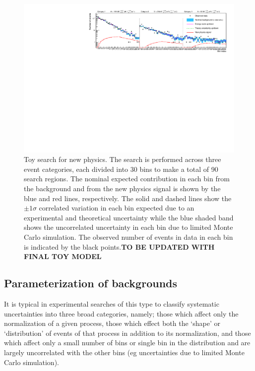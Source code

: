 \documentclass[11pt]{article}
\begin{document}
\begin{figure}%
\begin{center}
\includegraphics[width=\textwidth]{figures/t}
\end{center}
\caption{Toy search for new physics. The search is performed across three event categories, each divided into 30 bins to make a total of 90 search regions. The nominal expected contribution in each bin from the
background and from the new physics signal is shown by the blue and red lines, respectively. The solid and dashed lines show the $\pm1\sigma$ correlated variation in each bin expected due to an experimental and theoretical
uncertainty while the blue shaded band shows the uncorrelated uncertainty in each bin due to limited Monte Carlo simulation. The observed number of events in data in each bin is indicated by the black points.\textbf{TO BE UPDATED WITH FINAL TOY MODEL}}
\label{fig:toy}
\end{figure}


\subsection{Parameterization of backgrounds}

It is typical in experimental searches of this type to classify systematic uncertainties into three broad categories, namely; those which affect only the normalization of a given process, those which effect both the
`shape' or `distribution' of events of that process in addition to its normalization, and those which affect only a small number of bins or single bin in the distribution and are largely uncorrelated with the other
bins (eg uncertainties due to limited Monte Carlo simulation).
\end{document}
